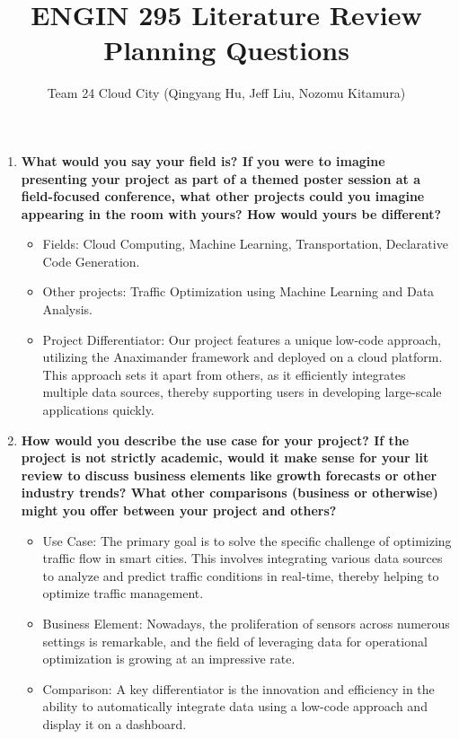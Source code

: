 \documentclass[12pt]{article}
\title{ENGIN 295 Literature Review Planning Questions}
\author{Team 24 Cloud City (Qingyang Hu, Jeff Liu, Nozomu Kitamura)}
\date{}
\begin{document}
\maketitle
\begin{enumerate}
    \item \textbf{What would you say your field is? If you were to imagine presenting your project as part of a themed poster session at a field-focused conference, what other projects could you imagine appearing in the room with yours?  How would yours be different?}

\begin{itemize}
    \item Fields: Cloud Computing, Machine Learning, Transportation, Declarative Code Generation.
    \item Other projects: Traffic Optimization using Machine Learning and Data Analysis.
    \item Project Differentiator: Our project features a unique low-code approach, utilizing the Anaximander framework and deployed on a cloud platform. This approach sets it apart from others, as it efficiently integrates multiple data sources, thereby supporting users in developing large-scale applications quickly.
\end{itemize}


    \item \textbf{How would you describe the use case for your project? If the project is not strictly academic, would it make sense for your lit review to discuss business elements like growth forecasts or other industry trends?  What other comparisons (business or otherwise) might you offer between your project and others?}

    \begin{itemize}
        \item Use Case: The primary goal is to solve the specific challenge of optimizing traffic flow in smart cities. This involves integrating various data sources to analyze and predict traffic conditions in real-time, thereby helping to optimize traffic management.
        \item Business Element: Nowadays, the proliferation of sensors across numerous settings is remarkable, and the field of leveraging data for operational optimization is growing at an impressive rate.
        \item Comparison: A key differentiator is the innovation and efficiency in the ability to automatically integrate data using a low-code approach and display it on a dashboard.
    \end{itemize}







\end{enumerate}
\end{document}
